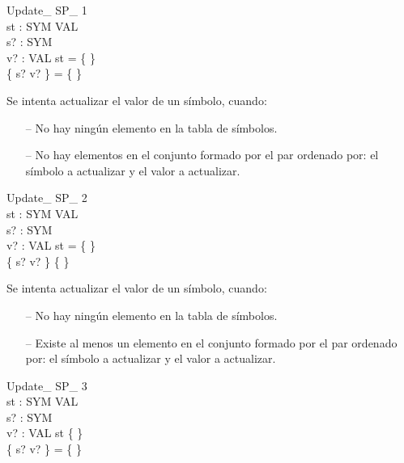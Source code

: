 \begin{schema}{Update\_ SP\_ 1}\\
 st : SYM \pfun VAL \\
 s? : SYM \\
 v? : VAL 
\where
 st = \{ \} \\
 \{ s? \mapsto v? \} = \{ \}
\end{schema}

\begin{tcolorbox}[colback=gray!5!white,colframe=gray!50!black,
  colbacktitle=gray!75!black,title=Update\_ SP\_ 1]
  Se intenta actualizar el valor de un símbolo, cuando:
     \begin{itemize}
        \item[--]{No hay ningún elemento en la tabla de símbolos.}
        \item[--]{No hay elementos en el conjunto formado por el par ordenado por: el símbolo a actualizar y el valor a actualizar.}
      \end{itemize}
\end{tcolorbox}


\begin{schema}{Update\_ SP\_ 2}\\
 st : SYM \pfun VAL \\
 s? : SYM \\
 v? : VAL 
\where
 st = \{ \} \\
 \{ s? \mapsto v? \} \neq \{ \}
\end{schema}

\begin{tcolorbox}[colback=gray!5!white,colframe=gray!50!black,
  colbacktitle=gray!75!black,title=Update\_ SP\_ 2]
  Se intenta actualizar el valor de un símbolo, cuando:
     \begin{itemize}
        \item[--]{No hay ningún elemento en la tabla de símbolos.}
        \item[--]{Existe al menos un elemento en el conjunto formado por el par ordenado por: el símbolo a actualizar y el valor a actualizar.}
     \end{itemize}
\end{tcolorbox}


\begin{schema}{Update\_ SP\_ 3}\\
 st : SYM \pfun VAL \\
 s? : SYM \\
 v? : VAL 
\where
 st \neq \{ \} \\
 \{ s? \mapsto v? \} = \{ \}
\end{schema}

